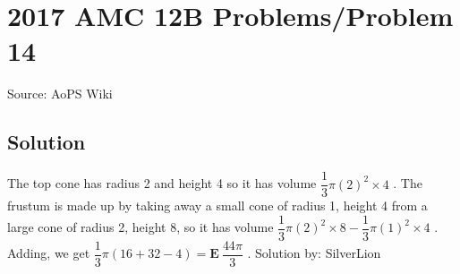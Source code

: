 \documentclass[12pt]{article}
\begin{document}
\section*{{2017 AMC 12B Problems/Problem 14}}
Source: AoPS Wiki

\subsection*{Solution}
The top cone has radius 2 and height 4 so it has volume $\dfrac{1}{3} \pi (2)^2 \times 4$ . The frustum is made up by taking away a small cone of radius 1, height 4 from a large cone of radius 2, height 8, so it has volume $\dfrac{1}{3} \pi (2)^2 \times 8 - \dfrac{1}{3} \pi (1)^2 \times 4$ . Adding, we get $\dfrac{1}{3} \pi (16+32-4) = \boxed{ \textbf{E} \ \dfrac{44\pi}{3}}$ . Solution by: SilverLion
\end{document}
